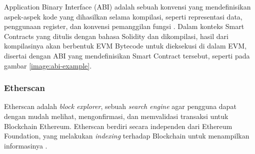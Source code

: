 Application Binary Interface (ABI) adalah sebuah konvensi yang mendefinisikan aspek-aspek kode yang dihasilkan selama kompilasi, seperti representasi data, penggunaan register, dan konvensi pemanggilan fungsi \parencite{sciencedirect2024}. Dalam konteks Smart Contracts yang ditulis dengan bahasa Solidity dan dikompilasi, hasil dari kompilasinya akan berbentuk EVM Bytecode untuk dieksekusi di dalam EVM, disertai dengan ABI yang mendefinisikan Smart Contract tersebut, seperti pada gambar \ref{image:abi-example}.

\subsubsection{Etherscan}
\label{subsubsec:etherscan}

Etherscan adalah \textit{block explorer}, sebuah \textit{search engine} agar pengguna dapat dengan mudah melihat, mengonfirmasi, dan memvalidasi transaksi untuk Blockchain Ethereum. Etherscan berdiri secara independen dari Ethereum Foundation, yang melakukan \textit{indexing} terhadap Blockchain untuk menampilkan informasinya \parencite{etherscan2024}.